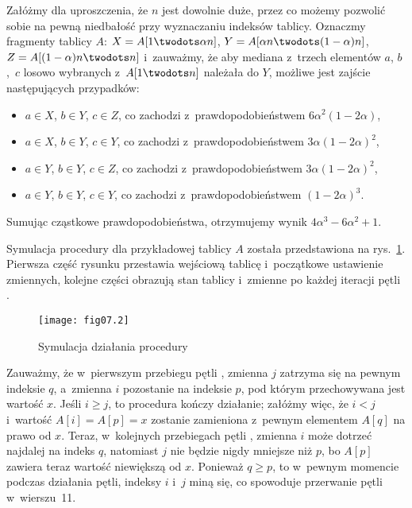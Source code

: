 \exercise %
Załóżmy dla uproszczenia, że $n$ jest dowolnie duże, przez co możemy pozwolić sobie na pewną niedbałość przy wyznaczaniu indeksów tablicy. Oznaczmy fragmenty tablicy $A$: $X=A[1\twodots\alpha n]$, $Y=A[\alpha n\twodots(1-\alpha)n]$, $Z=A[(1-\alpha)n\twodots n]$ i~zauważmy, że aby mediana z~trzech elementów $a$, $b$,~$c$ losowo wybranych z~$A[1\twodots n]$ należała do $Y$, możliwe jest zajście następujących przypadków:
\begin{itemize}
	\item $a\in X$, $b\in Y$, $c\in Z$, co zachodzi z~prawdopodobieństwem $6\alpha^2(1-2\alpha)$,
	\item $a\in X$, $b\in Y$, $c\in Y$, co zachodzi z~prawdopodobieństwem $3\alpha(1-2\alpha)^2$,
	\item $a\in Y$, $b\in Y$, $c\in Z$, co zachodzi z~prawdopodobieństwem $3\alpha(1-2\alpha)^2$,
	\item $a\in Y$, $b\in Y$, $c\in Y$, co zachodzi z~prawdopodobieństwem $(1-2\alpha)^3$.
\end{itemize}
Sumując cząstkowe prawdopodobieństwa, otrzymujemy wynik $4\alpha^3-6\alpha^2+1$.

\problems


\subproblem %
Symulacja procedury  dla przykładowej tablicy $A$ została przedstawiona na rys.~\ref{fig:7-1a}. Pierwsza część rysunku przestawia wejściową tablicę i~początkowe ustawienie zmiennych, kolejne części obrazują stan tablicy i~zmienne po każdej iteracji pętli .
\begin{figure}[ht]
	\begin{center}
		\texttt{[image: fig07.2]}
	\end{center}
	\caption{Symulacja działania procedury } \label{fig:7-1a}
\end{figure}

\subproblem %
Zauważmy, że w~pierwszym przebiegu pętli , zmienna $j$ zatrzyma się na pewnym indeksie $q$, a~zmienna $i$ pozostanie na indeksie $p$, pod którym przechowywana jest wartość $x$. Jeśli $i\ge j$, to procedura kończy działanie; załóżmy więc, że $i<j$ i~wartość $A[i]=A[p]=x$ zostanie zamieniona z~pewnym elementem $A[q]$ na prawo od $x$. Teraz, w~kolejnych przebiegach pętli , zmienna $i$ może dotrzeć najdalej na indeks $q$, natomiast $j$ nie będzie nigdy mniejsze niż $p$, bo $A[p]$ zawiera teraz wartość niewiększą od $x$. Ponieważ $q\ge p$, to w~pewnym momencie podczas działania pętli, indeksy $i$ i~$j$ miną się, co spowoduje przerwanie pętli w~wierszu~11.

